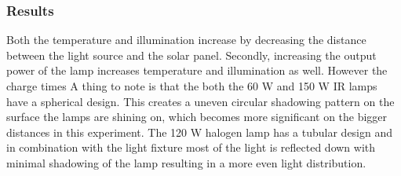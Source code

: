 \subsubsection{Results}

Both the temperature and illumination increase by decreasing the distance between the light source and the solar panel. 
Secondly, increasing the output power of the lamp increases temperature and illumination as well. 
However the charge times 
A thing to note is that the both the 60 W and 150 W IR lamps have a spherical design. This creates a uneven circular shadowing pattern on the surface the lamps are shining on, which becomes more significant on the bigger distances in this experiment.
The 120 W halogen lamp has a tubular design and in combination with the light fixture most of the light is reflected down with minimal shadowing of the lamp resulting in a more even light distribution.

